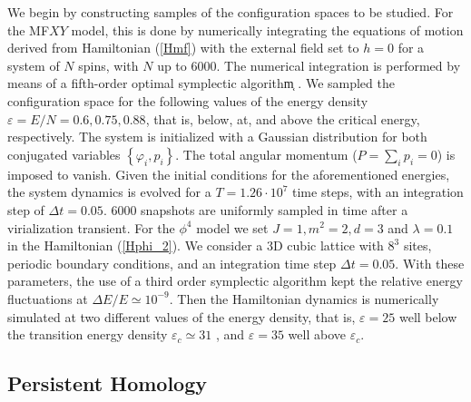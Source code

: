 \documentclass[preprintnumbers,showpacs, showkeys, twocolumn,secnumarabic,amssymb,amsmath,amsfonts,aps, pre]{revtex4-1}
\begin{document}
We begin by  constructing samples of the configuration spaces to be studied.
For the MF$XY$ model, this is done by numerically integrating the equations of motion derived from Hamiltonian (\ref{Hmf}) with the external field set to $h=0$ for a system of $N$ spins, with $N$ up to 6000. 
The numerical integration is performed by means of a fifth-order optimal symplectic algorithm͔ \cite{McLachlan92}. 
We sampled the configuration space for the following values of the energy density $\varepsilon=E/N =0.6, 0.75, 0.88$, that is,  below, at, and above the critical energy, respectively. 
The system is initialized with a Gaussian distribution for both conjugated variables
$\left\lbrace\varphi_i,p_i\right\rbrace$.
The total angular momentum ($P=\sum_{i}p_{i}=0$) is imposed to vanish. 
Given the initial conditions for the aforementioned energies, the system dynamics is evolved for a $T=1.26 \cdot 10^7$ time steps, with an integration step of $\Delta t=0.05$. $6000$ snapshots are uniformly sampled in time after a virialization transient.
For the $ \phi^4 $ model we set $ J=1, m^2=2, d=3$ and $\lambda=0.1$ in the Hamiltonian (\ref{Hphi_2}). 
We consider a 3D cubic lattice with $8^3$ sites,  periodic boundary conditions, and an integration time step $\Delta t=0.05$. With these parameters, the use of a third order symplectic algorithm \cite{Casetti:1995} kept the relative energy fluctuations at $\Delta E/E \simeq 10^{-9}$.
Then the Hamiltonian dynamics is numerically simulated at two different values of the energy density, that is, $\varepsilon =25$ well below the transition energy density $\varepsilon_c \simeq 31$ \cite{CCCPPG}, and $\varepsilon =35$ well above $\varepsilon_c$.
\vskip -100pt

\subsection{Persistent Homology}
\end{document}
